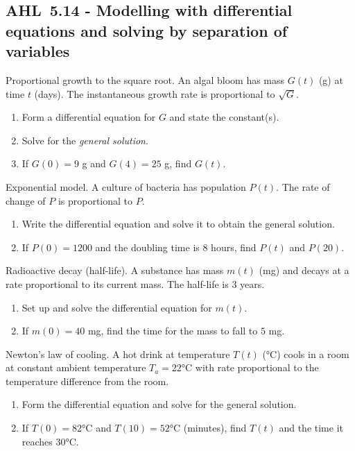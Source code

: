 \documentclass[11pt]{article}
\def\textbf#1{#1}%
\newcommand{\tocsubsection}[1]{\subsection{#1}}
\newcounter{question}
\begin{document}
\tocsubsection{AHL 5.14 - Modelling with differential equations and solving by separation of variables}

\begin{question}
\textbf{Proportional growth to the square root.}
An algal bloom has mass $G(t)$ (g) at time $t$ (days). The instantaneous growth rate is proportional to $\sqrt{G}$.
\begin{enumerate}
  \item Form a differential equation for $G$ and state the constant(s).
  \item Solve for the \emph{general solution}.
  \item If $G(0)=9$ g and $G(4)=25$ g, find $G(t)$.
\end{enumerate}
\end{question}

\begin{question}
\textbf{Exponential model.}
A culture of bacteria has population $P(t)$. The rate of change of $P$ is proportional to $P$.
\begin{enumerate}
  \item Write the differential equation and solve it to obtain the general solution.
  \item If $P(0)=1200$ and the doubling time is $8$ hours, find $P(t)$ and $P(20)$.
\end{enumerate}
\end{question}

\begin{question}
\textbf{Radioactive decay (half-life).}
A substance has mass $m(t)$ (mg) and decays at a rate proportional to its current mass. The half-life is $3$ years.
\begin{enumerate}
  \item Set up and solve the differential equation for $m(t)$.
  \item If $m(0)=40$ mg, find the time for the mass to fall to $5$ mg.
\end{enumerate}
\end{question}

\begin{question}
\textbf{Newton’s law of cooling.}
A hot drink at temperature $T(t)$ (°C) cools in a room at constant ambient temperature $T_a=22$°C with rate proportional to the temperature difference from the room.
\begin{enumerate}
  \item Form the differential equation and solve for the general solution.
  \item If $T(0)=82$°C and $T(10)=52$°C (minutes), find $T(t)$ and the time it reaches $30$°C.
\end{enumerate}
\end{question}
\end{document}
